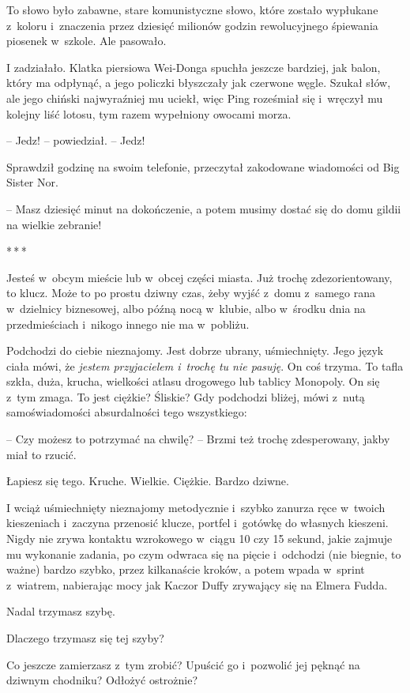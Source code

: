\documentclass[oneside,polish,11pt,rmheadings]{mwbk}
\newcommand{\threeast}{\par\centerline{*\,*\,*}\medskip\par}
\begin{document}
 To słowo było zabawne, stare komunistyczne słowo, które zostało wypłukane z~koloru i~znaczenia przez dziesięć milionów godzin rewolucyjnego śpiewania piosenek w~szkole. Ale pasowało.

I zadziałało. Klatka piersiowa Wei-Donga spuchła jeszcze bardziej, jak balon, który ma odpłynąć, a jego policzki błyszczały jak czerwone węgle. Szukał słów, ale jego chiński najwyraźniej mu uciekł, więc Ping roześmiał się i~wręczył mu kolejny liść lotosu, tym razem wypełniony owocami morza.

-- Jedz! -- powiedział. -- Jedz! 

 Sprawdził godzinę na swoim telefonie, przeczytał zakodowane wiadomości od Big Sister Nor. 
 
 -- Masz dziesięć minut na dokończenie, a potem musimy dostać się do domu gildii na wielkie zebranie! 

\bigskip
\threeast

Jesteś w~obcym mieście lub w~obcej części miasta. Już trochę zdezorientowany, to klucz. Może to po prostu dziwny czas, żeby wyjść z~domu z~samego rana w~dzielnicy biznesowej, albo późną nocą w~klubie, albo w~środku dnia na przedmieściach i~nikogo innego nie ma w~pobliżu.

Podchodzi do ciebie nieznajomy. Jest dobrze ubrany, uśmiechnięty. Jego język ciała mówi, że \textit{jestem przyjacielem i~trochę tu nie pasuję}. On coś trzyma. To tafla szkła, duża, krucha, wielkości atlasu drogowego lub tablicy Monopoly. On się z~tym zmaga. To jest ciężkie? Śliskie? Gdy podchodzi bliżej, mówi z~nutą samoświadomości absurdalności tego wszystkiego: 

-- Czy możesz to potrzymać na chwilę? -- Brzmi też trochę zdesperowany, jakby miał to rzucić.

Łapiesz się tego. Kruche. Wielkie. Ciężkie. Bardzo dziwne.

I wciąż uśmiechnięty nieznajomy metodycznie i~szybko zanurza ręce w~twoich kieszeniach i~zaczyna przenosić klucze, portfel i~gotówkę do własnych kieszeni. Nigdy nie zrywa kontaktu wzrokowego w~ciągu 10 czy 15 sekund, jakie zajmuje mu wykonanie zadania, po czym odwraca się na pięcie i~odchodzi (nie biegnie, to ważne) bardzo szybko, przez kilkanaście kroków, a potem wpada w~sprint z~wiatrem, nabierając mocy jak Kaczor Duffy zrywający się na Elmera Fudda.

Nadal trzymasz szybę.

Dlaczego trzymasz się tej szyby?

Co jeszcze zamierzasz z~tym zrobić? Upuścić go i~pozwolić jej pęknąć na dziwnym chodniku? Odłożyć ostrożnie?
\end{document}
